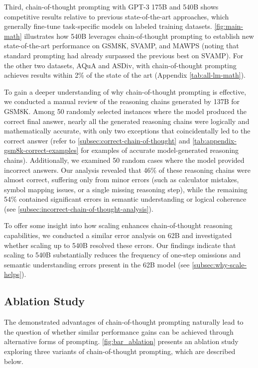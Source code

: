Third, chain-of-thought prompting with GPT-3 175B and \palm{} 540B shows competitive results relative to previous state-of-the-art approaches, which generally fine-tune task-specific models on labeled training datasets. \cref{fig:main-math} illustrates how \palm{} 540B leverages chain-of-thought prompting to establish new state-of-the-art performance on GSM8K, SVAMP, and MAWPS (noting that standard prompting had already surpassed the previous best on SVAMP). For the other two datasets, AQuA and ASDiv, \palm{} with chain-of-thought prompting achieves results within 2\% of the state of the art (Appendix \cref{tab:all-lm-math}).

To gain a deeper understanding of why chain-of-thought prompting is effective, we conducted a manual review of the reasoning chains generated by \lamda{} 137B for GSM8K. Among 50 randomly selected instances where the model produced the correct final answer, nearly all the generated reasoning chains were logically and mathematically accurate, with only two exceptions that coincidentally led to the correct answer (refer to \cref{subsec:correct-chain-of-thought} and \cref{tab:appendix-gsm8k-correct-examples} for examples of accurate model-generated reasoning chains). Additionally, we examined 50 random cases where the model provided incorrect answers. Our analysis revealed that 46\% of these reasoning chains were almost correct, suffering only from minor errors (such as calculator mistakes, symbol mapping issues, or a single missing reasoning step), while the remaining 54\% contained significant errors in semantic understanding or logical coherence (see \cref{subsec:incorrect-chain-of-thought-analysis}). 

To offer some insight into how scaling enhances chain-of-thought reasoning capabilities, we conducted a similar error analysis on \palm{} 62B and investigated whether scaling up to \palm{} 540B resolved these errors. Our findings indicate that scaling \palm{} to 540B substantially reduces the frequency of one-step omissions and semantic understanding errors present in the 62B model (see \cref{subsec:why-scale-helps}).

\subsection{Ablation Study}\label{subsec:math-ablation}

The demonstrated advantages of chain-of-thought prompting naturally lead to the question of whether similar performance gains can be achieved through alternative forms of prompting. 
\cref{fig:bar_ablation} presents an ablation study exploring three variants of chain-of-thought prompting, which are described below.

